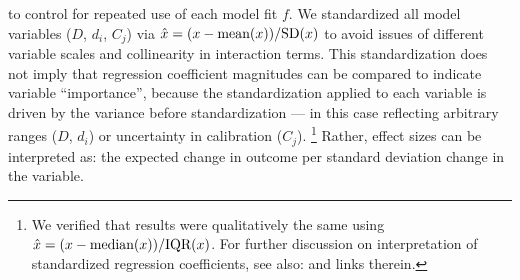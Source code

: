 to control for repeated use of each model fit $f$.
We standardized all model variables ($D$, $d_i$, $C_j$) via
$\hat{x} = (x - \textnormal{mean}(x)) / \textnormal{SD}(x)$
to avoid issues of different variable scales and collinearity in interaction terms.
This standardization does not imply that
regression coefficient magnitudes can be compared to indicate variable ``importance'',
because the standardization applied to each variable is driven
by the variance before standardization
--- in this case reflecting arbitrary ranges ($D$, $d_i$) or uncertainty in calibration ($C_j$).%
\footnote{We verified that results were qualitatively the same using
  $\hat{x} = (x - \textnormal{median}(x)) / \textnormal{IQR}(x)$.
  For further discussion on interpretation of standardized regression coefficients,
  see also:  and links therein.}
Rather, effect sizes can be interpreted as:
the expected change in outcome per standard deviation change in the variable.
